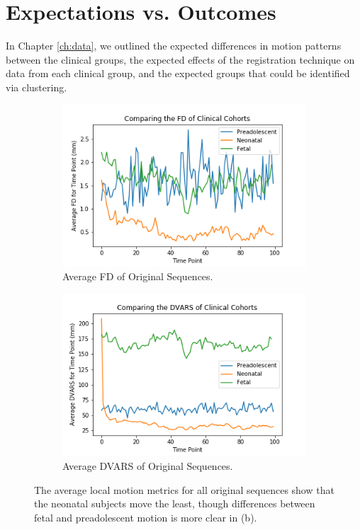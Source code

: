 \section{Expectations vs. Outcomes}

In Chapter \ref{ch:data}, we outlined the expected differences in motion patterns between the clinical groups, the expected effects of the registration technique on data from each clinical group, and the expected groups that could be identified via clustering.

\begin{figure}
	\centering
	\begin{subfigure}{0.4\textwidth}
		\centering
		\includegraphics[width=1.0\textwidth]{7/figures/orig-avg-fd.png}
		\caption{Average FD of Original Sequences.}
	\end{subfigure}
	\hspace{0.05\textwidth}
	\begin{subfigure}{0.4\textwidth}
		\centering
		\includegraphics[width=1.0\textwidth]{7/figures/orig-avg-dvars.png}
		\caption{Average DVARS of Original Sequences.}
	\end{subfigure}
	
\caption{The average local motion metrics for all original sequences show that the neonatal subjects move the least, though differences between fetal and preadolescent motion is more clear in (b).}
\label{fig:orig-local-motion}
\end{figure}

